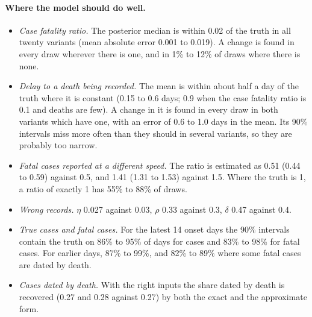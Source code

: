 \documentclass[11pt,a4paper]{article}
\begin{document}
\paragraph{Where the model should do well.}
\begin{itemize}
\item \emph{Case fatality ratio.} The posterior median is within 0.02 of
the truth in all twenty variants (mean absolute error 0.001 to 0.019). A
change is found in every draw wherever there is one, and in 1\% to 12\% of
draws where there is none.
\item \emph{Delay to a death being recorded.} The mean is within about half
a day of the truth where it is constant (0.15 to 0.6 days; 0.9 when the
case fatality ratio is 0.1 and deaths are few). A change in it is found in
every draw in both variants which have one, with an error of 0.6 to 1.0
days in the mean. Its 90\% intervals miss more often than they should in
several variants, so they are probably too narrow.
\item \emph{Fatal cases reported at a different speed.} The ratio is
estimated as 0.51 (0.44 to 0.59) against 0.5, and 1.41 (1.31 to 1.53)
against 1.5. Where the truth is 1, a ratio of exactly 1 has 55\% to 88\% of
draws.
\item \emph{Wrong records.} $\eta$ 0.027 against 0.03, $\rho$ 0.33 against
0.3, $\delta$ 0.47 against 0.4.
\item \emph{True cases and fatal cases.} For the latest 14 onset days the
90\% intervals contain the truth on 86\% to 95\% of days for cases and 83\%
to 98\% for fatal cases. For earlier days, 87\% to 99\%, and 82\% to 89\%
where some fatal cases are dated by death.
\item \emph{Cases dated by death.} With the right inputs the share dated
by death is recovered (0.27 and 0.28 against 0.27) by both the exact and
the approximate form.
\end{itemize}
\end{document}
